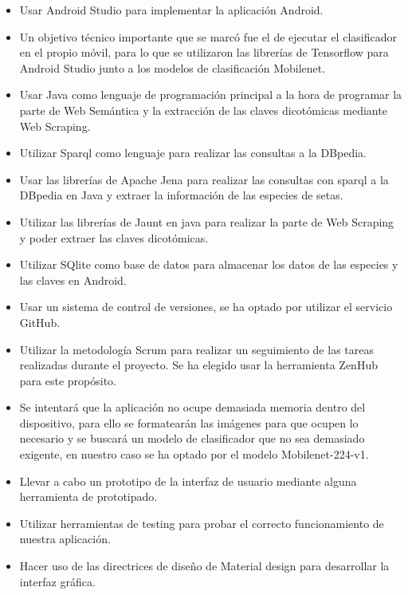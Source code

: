 \begin{itemize}
	\item Usar Android Studio para implementar la aplicación Android.
	\item Un objetivo técnico importante que se marcó fue el de ejecutar el clasificador en el propio móvil, para lo que se utilizaron las librerías de Tensorflow para Android Studio junto a los modelos de clasificación Mobilenet.
	\item Usar Java como lenguaje de programación principal a la hora de programar la parte de Web Semántica y la extracción de las claves dicotómicas mediante Web Scraping.
	\item Utilizar Sparql como lenguaje para realizar las consultas a la DBpedia.
	\item Usar las librerías de Apache Jena para realizar las consultas con sparql a la DBpedia en Java y extraer la información de las especies de setas.
	\item Utilizar las librerías de Jaunt en java para realizar la parte de Web Scraping y poder extraer las claves dicotómicas.
	\item Utilizar SQlite como base de datos para almacenar los datos de las especies y las claves en Android.
	\item Usar un sistema de control de versiones, se ha optado por utilizar el servicio GitHub.
	\item Utilizar la metodología Scrum para realizar un seguimiento de las tareas realizadas durante el proyecto. Se ha elegido usar la herramienta ZenHub para este propósito.
	\item Se intentará que la aplicación no ocupe demasiada memoria dentro del dispositivo, para ello se formatearán las imágenes para que ocupen lo necesario y se buscará un modelo de clasificador que no sea demasiado exigente, en nuestro caso se ha optado por el modelo Mobilenet-224-v1.
	\item Llevar a cabo un prototipo de la interfaz de usuario mediante alguna herramienta de prototipado.
	\item Utilizar herramientas de testing para probar el correcto funcionamiento de nuestra aplicación.
	\item Hacer uso de las directrices de diseño de Material design para desarrollar la interfaz gráfica.
\end{itemize}

